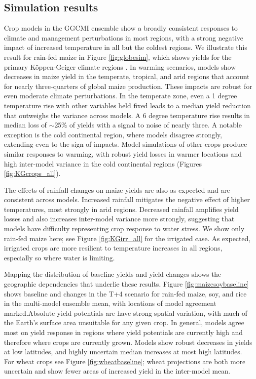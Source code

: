 \documentclass[preprint, 5p, times, twocolumn]{elsarticle}
\begin{document}
\subsection{Simulation results}
Crop models in the GGCMI ensemble show a broadly consistent responses to climate and management perturbations in most regions, with a strong negative impact of increased temperature in all but the coldest regions. We illustrate this result for rain-fed maize in Figure \ref{fig:globesim}, which shows yields for the primary K\"{o}ppen-Geiger climate regions \citep{rubel2010}. In warming scenarios, models show decreases in maize yield in the temperate, tropical, and arid regions that account for nearly three-quarters of global maize production. These impacts are robust for even moderate climate perturbations. In the temperate zone, even a 1 degree temperature rise with other variables held fixed leads to a median yield reduction that outweighs the variance across models. A 6 degree temperature rise results in median loss of $\sim$25\% of yields with a signal to noise of nearly three. A notable exception is the cold continental region, where models disagree strongly, extending even to the sign of impacts. Model simulations of other crops produce similar responses to warming, with robust yield losses in warmer locations and high inter-model variance in the cold continental regions (Figures \ref{fig:KGcrops_all}).

The effects of rainfall changes on maize yields are also as expected and are consistent across models. Increased rainfall mitigates the negative effect of higher temperatures, most strongly in arid regions. Decreased rainfall amplifies yield losses and also increases inter-model variance more strongly, suggesting that models have difficulty representing crop response to water stress.  We show only rain-fed maize here; see Figure \ref{fig:KGirr_all} for the irrigated case. As expected, irrigated crops are more resilient to temperature increases in all regions, especially so where water is limiting.  

Mapping the distribution of baseline yields and yield changes shows the geographic dependencies that underlie these results. Figure \ref{fig:maizesoybaseline} shows baseline and changes in the T+4 scenario for rain-fed maize, soy, and rice in the multi-model ensemble mean, with locations of model agreement marked.Absolute yield potentials are have strong spatial variation, with much of the Earth's surface area unsuitable for any given crop. In general, models agree most on yield response in regions where yield potentials are currently high and therefore where crops are currently grown. Models show robust decreases in yields at low latitudes, and highly uncertain median increases at most high latitudes. For wheat crops see Figure \ref{fig:wheatbaseline}; wheat projections are both more uncertain and show fewer areas of increased yield in the inter-model mean. 
\end{document}
